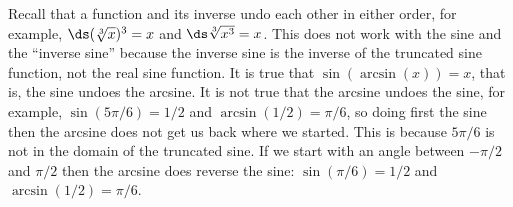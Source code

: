 
Recall that a function and its inverse undo each other in either
order, for example, $\ds (\root3\of x)^3=x$ and $\ds \root3\of{x^3}=x$. This
does not work with the sine and the ``inverse sine'' because the
inverse sine is the inverse of the truncated sine function, not the
real sine function. It is true that $\sin(\arcsin(x))=x$, that is, the
sine undoes the arcsine. It is not true that the arcsine undoes the
sine, for example, $\sin(5\pi/6)=1/2$ and $\arcsin(1/2)=\pi/6$, so
doing first the sine then the arcsine does not get us back where we
started. This is because $5\pi/6$ is not in the domain of the
truncated sine. If we start with an angle between $-\pi/2$ and $\pi/2$
then the arcsine does reverse the sine: $\sin(\pi/6)=1/2$ and
$\arcsin(1/2)=\pi/6$.


